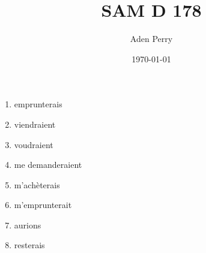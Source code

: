 \documentclass{article}
\title{SAM D 178}
\author{Aden Perry}
\date{\today}
\begin{document}
\maketitle

\begin{enumerate}
    \item emprunterais
    \item viendraient
    \item voudraient
    \item me demanderaient
    \item m'achèterais
    \item m'emprunterait
    \item aurions
    \item resterais
\end{enumerate}
\end{document}
